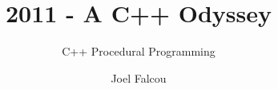 \documentclass{beamer}
\title{2011 - A C++ Odyssey}
\subtitle{C++ Procedural Programming}
\author{Joel Falcou}
\institute{Laboratoire de Recherche en Informatique - Université Paris Sud 11}
\date{}
\begin{document}
\begin{frame}[plain]
\titlepage
\end{frame}

%

%

%

%

%
\end{document}
